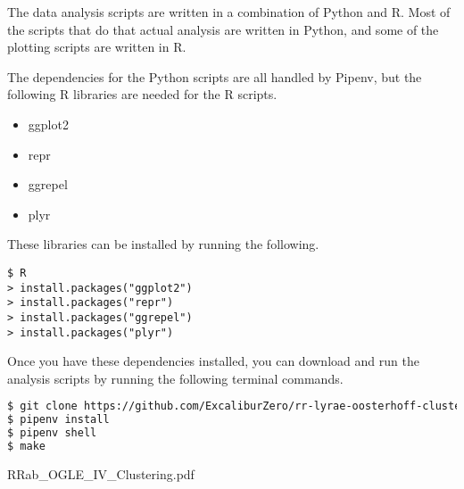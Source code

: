 \documentclass[]{article}
\begin{document}
The data analysis scripts are written in a combination of Python and R. Most of the scripts that do that actual analysis are written in Python, and some of the plotting scripts are written in R.

\vspace{12pt}

The dependencies for the Python scripts are all handled by Pipenv, but the following R libraries are needed for the R scripts.

\begin{itemize}
	\item ggplot2
	\item repr
	\item ggrepel
	\item plyr
\end{itemize}

These libraries can be installed by running the following.

\begin{lstlisting}
$ R
> install.packages("ggplot2")
> install.packages("repr")
> install.packages("ggrepel")
> install.packages("plyr")
\end{lstlisting}


Once you have these dependencies installed, you can download and run the analysis scripts by running the following terminal commands.

\vspace{12pt}

\begin{lstlisting}[language=bash]
$ git clone https://github.com/ExcaliburZero/rr-lyrae-oosterhoff-clustering
$ pipenv install
$ pipenv shell
$ make
\end{lstlisting}

\newpage


{RRab_OGLE_IV_Clustering.pdf}
\end{document}

